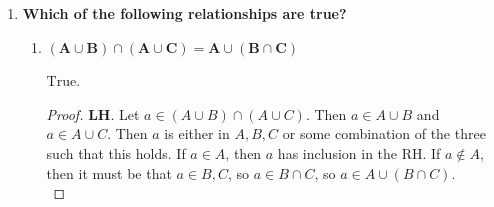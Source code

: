 \documentclass[10pt, oneside]{article}
\begin{document}
\begin{enumerate}[label=1.\arabic*]
\begin{enumerate}
	\item  \begin{tcolorbox}[
	  colback=Cerulean!5!white,
	  colframe=Cerulean!75!black]
	\textbf{$\bm{A \cup \overline{B}}$}
	\end{tcolorbox}
	
	$\overline{B} = \{ x \ | \ 0 \leq x < 1/4, 3/2 \leq x \leq 2 \} \implies \boxed{A \cup \overline{B} = \{ x \ | \ 0 \leq x < 1/4, 1/2 < x \leq 1, 3/2 \leq x \leq 2 \} }$
	
	\item  \begin{tcolorbox}[
	  colback=Cerulean!5!white,
	  colframe=Cerulean!75!black]
	\textbf{$\bm{\overline{A \cap B}}$}
	\end{tcolorbox}
	
	$A \cap B = \{ x \ | \ 1/2 < x \leq 1 \} \implies \boxed{ \overline{A \cap B} = \{ x \ | \ 0 \leq x \leq 1/2, 1 < x \leq 2 \} }$
	
	\item  \begin{tcolorbox}[
	  colback=Cerulean!5!white,
	  colframe=Cerulean!75!black]
	\textbf{$\bm{\overline{A} \cap B}$}
	\end{tcolorbox}
	
	$\overline{A} = \{ x \ | \ 0 \leq x \leq 1/2, 1 < x \leq 2 \} \implies \boxed{\overline{A} \cap B = \{ x \ | \ 1/4 \leq x \leq 1/2, 1 < x < 3/2 \}}$
	
	\end{enumerate}

\item  \begin{tcolorbox}[
  colback=Cerulean!5!white,
  colframe=Cerulean!75!black]
\textbf{Which of the following relationships are true?}
\end{tcolorbox}

	\begin{enumerate}
	\item  \begin{tcolorbox}[
	  colback=Cerulean!5!white,
	  colframe=Cerulean!75!black]
	\textbf{$\bm{(A \cup B) \cap (A \cup C) = A \cup (B \cap C)}$}
	\end{tcolorbox}
	
	$\boxed{\text{True}}$.
	
	\begin{proof}
	\textbf{LH}. Let $a \in (A \cup B) \cap (A \cup C)$. Then $a \in A \cup B$ and $a \in A \cup C$. Then $a$ is either in $A, B, C$ or some combination of the three such that this holds. If $a \in A$, then $a$ has inclusion in the RH. If $a \notin A$, then it must be that $a \in B, C$, so $a \in B \cap C$, so $a \in A \cup (B \cap C)$. \\
	

\end{proof}
\end{enumerate}
\end{enumerate}
\end{document}
